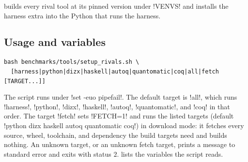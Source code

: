 { builds every rival tool at its pinned version under \code!VENVS! and installs the harness extra into the Python that runs the harness.
\subsection{Usage and variables}

\begin{lstlisting}[style=shell]
bash benchmarks/tools/setup_rivals.sh \
  [harness|python|dizx|haskell|autoq|quantomatic|coq|all|fetch [TARGET...]]
\end{lstlisting}

The script runs under \code!set -euo pipefail!. The default target is \code!all!, which runs \code!harness!, \code!python!, \code!dizx!, \code!haskell!, \code!autoq!, \code!quantomatic!, and \code!coq! in that order. The target \code!fetch! sets \code!FETCH=1! and runs the listed targets (default \code!python dizx haskell autoq quantomatic coq!) in download mode: it fetches every source, wheel, toolchain, and dependency the build targets need and builds nothing. An unknown target, or an unknown fetch target, prints a message to standard error and exits with status $2$.  lists the variables the script reads.

}
